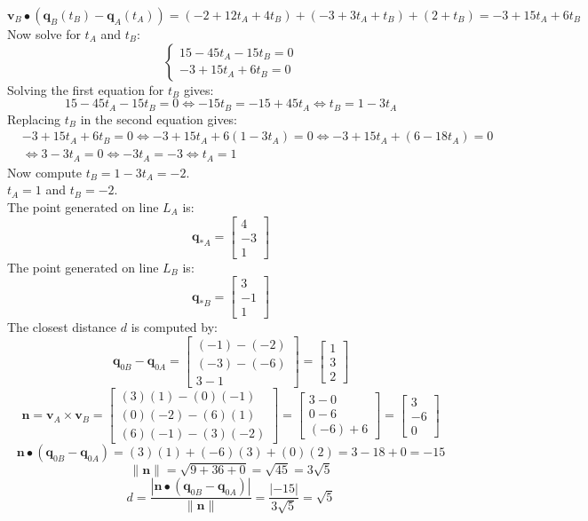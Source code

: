 \documentclass{article}
\begin{document}
\begin{itemize}
\[\mathbf{v}_B \bullet (\mathbf{q}_B(t_B) - \mathbf{q}_A(t_A)) = (-2 + 12t_A + 4t_B) + (-3 + 3t_A + t_B) + (2 + t_B) = -3 + 15t_A + 6t_B\]
Now solve for \(t_A\) and \(t_B\): 
\[\left\{\begin{array}{c}
15 - 45t_A - 15t_B = 0 \\ 
-3 + 15t_A + 6t_B = 0
\end{array}\right.\]
Solving the first equation for \(t_B\) gives:
\[15 - 45t_A - 15t_B = 0 \iff -15t_B = -15 + 45t_A \iff t_B = 1 - 3t_A\]
Replacing \(t_B\) in the second equation gives: 
\begin{align*}
& -3 + 15t_A + 6t_B = 0 
\iff -3 + 15t_A + 6(1 - 3t_A) = 0 
\iff -3 + 15t_A + (6 - 18t_A) = 0 \\
& \iff 3 - 3t_A = 0 
\iff -3t_A = -3 
\iff t_A = 1
\end{align*}
Now compute \(t_B = 1 - 3t_A = -2\). \\  
\(t_A = 1\) and \(t_B = -2\). \\  
The point generated on line \(L_A\) is:
\[\mathbf{q}_{*A} = \begin{bmatrix} 4 \\ -3 \\ 1 \end{bmatrix}\]
The point generated on line \(L_B\) is:
\[\mathbf{q}_{*B} = \begin{bmatrix} 3 \\ -1 \\ 1 \end{bmatrix}\] 
The closest distance \(d\) is computed by:
\[\mathbf{q}_{0B} - \mathbf{q}_{0A} = \begin{bmatrix} (-1) - (-2) \\ (-3) - (-6) \\ 3 - 1 \end{bmatrix} = \begin{bmatrix} 1 \\ 3 \\ 2 \end{bmatrix}\]
\[\mathbf{n} = \mathbf{v}_A \times \mathbf{v}_B = \begin{bmatrix} (3)(1) - (0)(-1) \\ (0)(-2) - (6)(1) \\ (6)(-1) - (3)(-2) \end{bmatrix}
 = \begin{bmatrix} 3 - 0 \\ 0 - 6 \\ (-6) + 6 \end{bmatrix} = \begin{bmatrix} 3 \\ -6 \\ 0 \end{bmatrix}\]
\[\mathbf{n} \bullet (\mathbf{q}_{0B} - \mathbf{q}_{0A}) = (3)(1) + (-6)(3) + (0)(2) = 3 - 18 + 0 = -15\]
\[\|\mathbf{n}\| = \sqrt{9 + 36 + 0} = \sqrt{45} = 3\sqrt{5}\]
\[d = \frac{|\mathbf{n} \bullet (\mathbf{q}_{0B} - \mathbf{q}_{0A})|}{\|\mathbf{n}\|} = \frac{|-15|}{3\sqrt{5}} = \sqrt{5}\]
\end{itemize}
\end{document}
